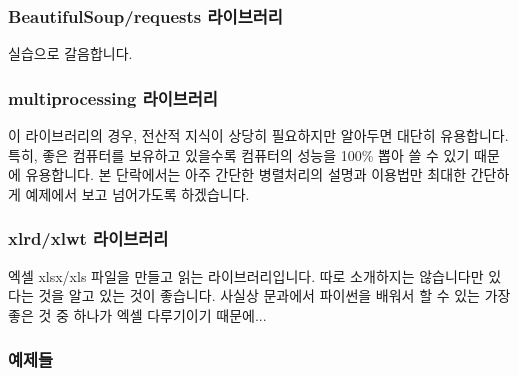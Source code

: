 \documentclass[twoside]{article}
\begin{document}
\subsubsection{BeautifulSoup/requests 라이브러리}

실습으로 갈음합니다. 


\subsubsection{multiprocessing 라이브러리} 

이 라이브러리의 경우, 전산적 지식이 상당히 필요하지만 알아두면 대단히 유용합니다. 특히, 좋은 컴퓨터를 보유하고 있을수록 컴퓨터의 성능을 100\% 뽑아 쓸 수 있기 때문에 유용합니다. 본 단락에서는 아주 간단한 병렬처리의 설명과 이용법만 최대한 간단하게 예제에서 보고 넘어가도록 하겠습니다.


\subsubsection{xlrd/xlwt 라이브러리}

엑셀 xlsx/xls 파일을 만들고 읽는 라이브러리입니다. 따로 소개하지는 않습니다만 있다는 것을 알고 있는 것이 좋습니다. 사실상 문과에서 파이썬을 배워서 할 수 있는 가장 좋은 것 중 하나가 엑셀 다루기이기 때문에... 



\subsubsection{예제들}
\end{document}
